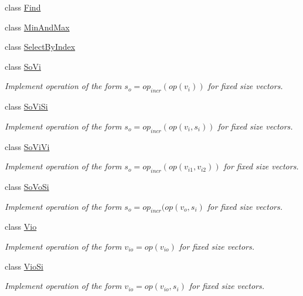 \begin{DoxyCompactItemize}
\item 
class \hyperlink{classvct_fixed_size_vector_recursive_engines_1_1_find}{Find}
\item 
class \hyperlink{classvct_fixed_size_vector_recursive_engines_1_1_min_and_max}{Min\-And\-Max}
\item 
class \hyperlink{classvct_fixed_size_vector_recursive_engines_1_1_select_by_index}{Select\-By\-Index}
\item 
class \hyperlink{classvct_fixed_size_vector_recursive_engines_1_1_so_vi}{So\-Vi}
\begin{DoxyCompactList}\small\item\em Implement operation of the form $s_o = op_{incr}(op(v_i))$ for fixed size vectors. \end{DoxyCompactList}\item 
class \hyperlink{classvct_fixed_size_vector_recursive_engines_1_1_so_vi_si}{So\-Vi\-Si}
\begin{DoxyCompactList}\small\item\em Implement operation of the form $s_o = op_{incr}(op(v_i, s_i))$ for fixed size vectors. \end{DoxyCompactList}\item 
class \hyperlink{classvct_fixed_size_vector_recursive_engines_1_1_so_vi_vi}{So\-Vi\-Vi}
\begin{DoxyCompactList}\small\item\em Implement operation of the form $s_o = op_{incr}(op(v_{i1}, v_{i2}))$ for fixed size vectors. \end{DoxyCompactList}\item 
class \hyperlink{classvct_fixed_size_vector_recursive_engines_1_1_so_vo_si}{So\-Vo\-Si}
\begin{DoxyCompactList}\small\item\em Implement operation of the form $s_o = op_{incr}(op(v_o, s_i)$ for fixed size vectors. \end{DoxyCompactList}\item 
class \hyperlink{classvct_fixed_size_vector_recursive_engines_1_1_vio}{Vio}
\begin{DoxyCompactList}\small\item\em Implement operation of the form $v_{io} = op(v_{io})$ for fixed size vectors. \end{DoxyCompactList}\item 
class \hyperlink{classvct_fixed_size_vector_recursive_engines_1_1_vio_si}{Vio\-Si}
\begin{DoxyCompactList}\small\item\em Implement operation of the form $ v_{io} = op(v_{io}, s_i)$ for fixed size vectors. \end{DoxyCompactList}\item 

\end{DoxyCompactItemize}
